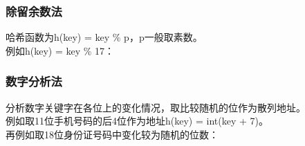 \subsubsection{除留余数法}

哈希函数为h(key) = key \% p，p一般取素数。 \\

例如h(key) = key \% 17：

\begin{table}[H]
	\centering
	\caption{除留余数法}
\end{table}

\subsubsection{数字分析法}

分析数字关键字在各位上的变化情况，取比较随机的位作为散列地址。 \\

例如取11位手机号码的后4位作为地址h(key) = int(key + 7)。 \\

再例如取18位身份证号码中变化较为随机的位数：

